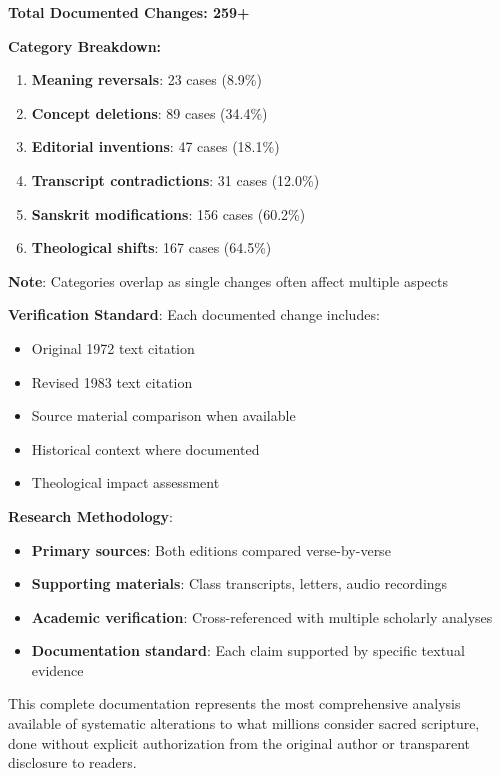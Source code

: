 \documentclass[11pt,twoside]{book}
\begin{document}
\textbf{\textbf{Total Documented Changes: 259+}}

\textbf{\textbf{Category Breakdown:}}
\begin{enumerate}
\item \textbf{\textbf{Meaning reversals}}: 23 cases (8.9\%)
\item \textbf{\textbf{Concept deletions}}: 89 cases (34.4\%)
\item \textbf{\textbf{Editorial inventions}}: 47 cases (18.1\%)
\item \textbf{\textbf{Transcript contradictions}}: 31 cases (12.0\%)
\item \textbf{\textbf{Sanskrit modifications}}: 156 cases (60.2\%)
\item \textbf{\textbf{Theological shifts}}: 167 cases (64.5\%)
\end{enumerate}

\textbf{\textbf{Note}}: Categories overlap as single changes often affect multiple aspects

\textbf{\textbf{Verification Standard}}: Each documented change includes:
\begin{itemize}
\item Original 1972 text citation
\item Revised 1983 text citation
\item Source material comparison when available
\item Historical context where documented
\item Theological impact assessment
\end{itemize}

\textbf{\textbf{Research Methodology}}: 
\begin{itemize}
\item \textbf{\textbf{Primary sources}}: Both editions compared verse-by-verse
\item \textbf{\textbf{Supporting materials}}: Class transcripts, letters, audio recordings
\item \textbf{\textbf{Academic verification}}: Cross-referenced with multiple scholarly analyses
\item \textbf{\textbf{Documentation standard}}: Each claim supported by specific textual evidence
\end{itemize}

This complete documentation represents the most comprehensive analysis available of systematic alterations to what millions consider sacred scripture, done without explicit authorization from the original author or transparent disclosure to readers.
\end{document}
